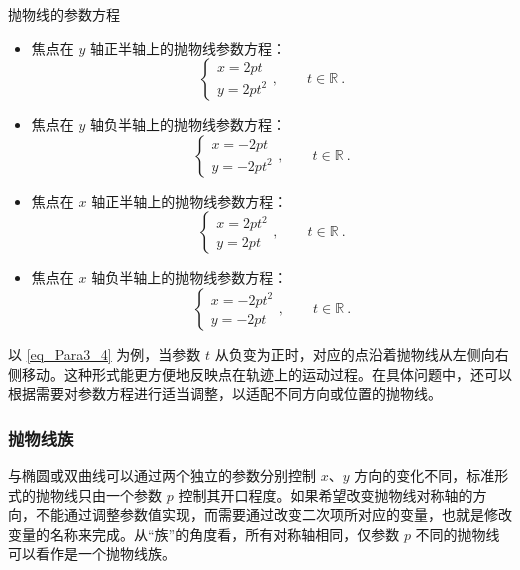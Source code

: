 \begin{theorem}{抛物线的参数方程}
\begin{itemize}
\item 焦点在 $y$ 轴正半轴上的抛物线参数方程：
\begin{equation}\label{eq_Para3_4}
\begin{cases}
x = 2pt \\
y = 2pt^2
\end{cases},\qquad t \in \mathbb{R}~.
\end{equation}
\item 焦点在 $y$ 轴负半轴上的抛物线参数方程：
\begin{equation}
\begin{cases}
x = -2pt \\
y = -2pt^2
\end{cases},\qquad t \in \mathbb{R}~.
\end{equation}
\item 焦点在 $x$ 轴正半轴上的抛物线参数方程：
\begin{equation}
\begin{cases}
x = 2pt^2 \\
y = 2pt
\end{cases},\qquad t \in \mathbb{R}~.
\end{equation}
\item 焦点在 $x$ 轴负半轴上的抛物线参数方程：
\begin{equation}
\begin{cases}
x = -2pt^2 \\
y = -2pt
\end{cases},\qquad t \in \mathbb{R}~.
\end{equation}
\end{itemize}
\end{theorem}

以 \autoref{eq_Para3_4} 为例，当参数 $t$ 从负变为正时，对应的点沿着抛物线从左侧向右侧移动。这种形式能更方便地反映点在轨迹上的运动过程。在具体问题中，还可以根据需要对参数方程进行适当调整，以适配不同方向或位置的抛物线。

\subsubsection{抛物线族}

与椭圆或双曲线可以通过两个独立的参数分别控制 $x$、$y$ 方向的变化不同，标准形式的抛物线只由一个参数 $p$ 控制其开口程度。如果希望改变抛物线对称轴的方向，不能通过调整参数值实现，而需要通过改变二次项所对应的变量，也就是修改变量的名称来完成。从“族”的角度看，所有对称轴相同，仅参数 $p$ 不同的抛物线可以看作是一个抛物线族。

